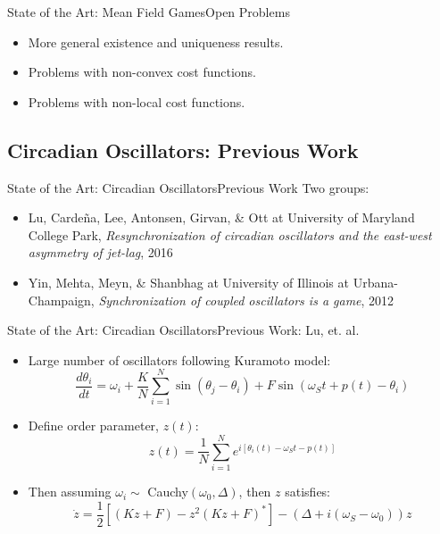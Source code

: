 \documentclass{beamer}
\begin{document}
\begin{frame}{State of the Art: Mean Field Games}{Open Problems}
	\begin{itemize}
		\item {
			More general existence and uniqueness results.
		}
		\item {
			Problems with non-convex cost functions.
		}
		\item {
			Problems with non-local cost functions.
		}
	\end{itemize}
\end{frame}

\subsection{Circadian Oscillators: Previous Work}

\begin{frame}{State of the Art: Circadian Oscillators}{Previous Work}
	Two groups:
	\begin{itemize}
		\item Lu, Carde\~na, Lee, Antonsen, Girvan, \& Ott at University of Maryland College Park, \textit{Resynchronization of circadian oscillators and the east-west asymmetry of jet-lag}, 2016
		\item Yin, Mehta, Meyn, \& Shanbhag at University of Illinois at Urbana-Champaign, \textit{Synchronization of coupled oscillators is a game}, 2012
	\end{itemize}
\end{frame}

\begin{frame}{State of the Art: Circadian Oscillators}{Previous Work: Lu, et. al.}
	\begin{itemize}
		\item Large number of oscillators following Kuramoto model:
		\begin{equation}
		\frac{d\theta_i}{dt}=\omega_i+\frac{K}{N} \sum_{i=1}^N \sin(\theta_j-\theta_i)+F \sin (\omega_S t+p(t)-\theta_i)
		\end{equation}
		\item Define order parameter, $z(t)$:
		\begin{equation}
		z(t)=\frac{1}{N}\sum_{i=1}^N e^{i[\theta_i(t)-\omega_St-p(t)]}
		\end{equation}
		\item Then assuming $\omega_i \sim$ Cauchy$(\omega_0,\Delta)$, then $z$ satisfies:
		\begin{equation}
		\dot{z}=\frac{1}{2} \left[(Kz+F)-z^2 (Kz+F)^* \right]- (\Delta+i(\omega_S-\omega_0))z
		\end{equation}
	\end{itemize}
\end{frame}
\end{document}
